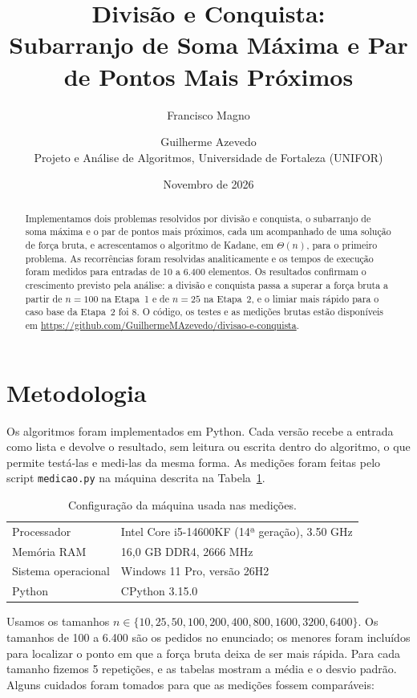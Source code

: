 \documentclass[11pt,a4paper]{article}
\title{\textbf{Divisão e Conquista:\\ Subarranjo de Soma Máxima e Par de Pontos Mais Próximos}}
\author{Francisco Magno \and Guilherme Azevedo\\[0.4em]
\small Projeto e Análise de Algoritmos, Universidade de Fortaleza (UNIFOR)}
\date{Novembro de 2026}
\begin{document}
\maketitle

\begin{abstract}
Implementamos dois problemas resolvidos por divisão e conquista, o subarranjo de soma máxima e o par de pontos mais próximos, cada um acompanhado de uma solução de força bruta, e acrescentamos o algoritmo de Kadane, em $\Theta(n)$, para o primeiro problema. As recorrências foram resolvidas analiticamente e os tempos de execução foram medidos para entradas de 10 a 6.400 elementos. Os resultados confirmam o crescimento previsto pela análise: a divisão e conquista passa a superar a força bruta a partir de $n = {100}$ na Etapa~1 e de $n = {25}$ na Etapa~2, e o limiar mais rápido para o caso base da Etapa~2 foi ${8}$. O código, os testes e as medições brutas estão disponíveis em  \url{https://github.com/GuilhermeMAzevedo/divisao-e-conquista}.
\end{abstract}

\section{Metodologia}

Os algoritmos foram implementados em Python. Cada versão recebe a entrada como lista e devolve o resultado, sem leitura ou escrita dentro do algoritmo, o que permite testá-las e medi-las da mesma forma. As medições foram feitas pelo script \texttt{medicao.py} na máquina descrita na Tabela~\ref{tab:maquina}.

\begin{table}[H]
\centering\small
\begin{tabular}{ll}
\toprule
Processador & {Intel Core i5-14600KF (14ª geração), 3.50 GHz} \\
Memória RAM & {16,0 GB DDR4, 2666 MHz} \\
Sistema operacional & {Windows 11 Pro, versão 26H2} \\
Python & {CPython 3.15.0} \\
\bottomrule
\end{tabular}
\caption{Configuração da máquina usada nas medições.}
\label{tab:maquina}
\end{table}

Usamos os tamanhos $n \in \{10, 25, 50, 100, 200, 400, 800, 1600, 3200, 6400\}$. Os tamanhos de 100 a 6.400 são os pedidos no enunciado; os menores foram incluídos para localizar o ponto em que a força bruta deixa de ser mais rápida. Para cada tamanho fizemos 5 repetições, e as tabelas mostram a média e o desvio padrão. Alguns cuidados foram tomados para que as medições fossem comparáveis:
\end{document}
